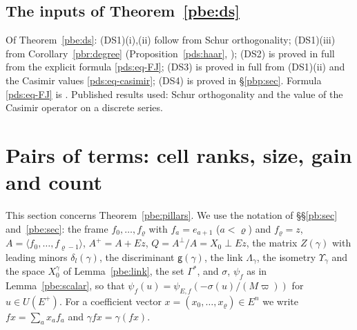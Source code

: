 \documentclass[10pt]{amsart}
\theoremstyle{definition}
\theoremstyle{remark}
\providecommand{\aubar}[1]{\overline{#1}}
\providecommand{\pbDid}{\mathcal D_{\mathrm{id}}}
\providecommand{\pbDmain}{\mathcal D_{\mathrm{main}}}
\providecommand{\pbR}{\overline R_0}
\begin{document}
\subsection{The inputs of Theorem~\ref{pbe:ds}}\label{pds:ss-summary}
Of Theorem~\ref{pbe:ds}: \textup{(DS1)(i),(ii)} follow from Schur orthogonality; \textup{(DS1)(iii)}
from Corollary~\ref{pbr:degree} \textup{(}Proposition~\ref{pds:haar}, {\cite[Proposition~2.19]{P49}}\textup{)}; \textup{(DS2)} is proved in full from the explicit formula
\eqref{pds:eq-FJ}; \textup{(DS3)} is proved in full from \textup{(DS1)(ii)} and the Casimir values
\eqref{pds:eq-casimir}; \textup{(DS4)} is proved in \S\ref{pbp:sec}. Formula \eqref{pds:eq-FJ} is
{\cite[Theorem~3.17]{P49}}. Published results used: Schur orthogonality and the value of the Casimir operator on a discrete series.



\providecommand{\auO}{\mathcal O}
\providecommand{\auNm}{\operatorname{Nm}}
\providecommand{\auA}{\mathbb A}
\providecommand{\aubar}[1]{\overline{#1}}
\providecommand{\auf}[1]{\texttt{#1}}
\providecommand{\panot}[1]{\par\smallskip{\raggedright\noindent\textbf{[Not proved here:} #1\textbf{]}\par}\smallskip}
\providecommand{\pbR}{\overline R_0}
\providecommand{\pbDid}{\mathcal D_{\mathrm{id}}}
\providecommand{\pbDmain}{\mathcal D_{\mathrm{main}}}
\providecommand{\pbg}{\mathsf g}
\providecommand{\pbeN}{\mathcal N}
\providecommand{\pbet}{\beta_*}
\providecommand{\pbenp}{\mathsf n_{\mathrm p}}
\providecommand{\pbesz}{\operatorname{size}}
\providecommand{\pbeGs}{\Gamma^*}
\providecommand{\pbeAp}{A^{+}}
\providecommand{\pbeCL}{\mathrm{CL}}
\providecommand{\ppiF}{\mathsf F}
\providecommand{\ppiLc}{\Lambda^{X}_{c}}
\providecommand{\ppidisc}{\operatorname{disc}}

\section{Pairs of terms: cell ranks, size, gain and count}\label{ppi:sec}

This section concerns Theorem~\ref{pbe:pillars}. We use the notation of \S\S\ref{pb:sec}
and~\ref{pbe:sec}: the frame $f_0,\dots,f_\varrho$ with $f_a=e_{a+1}$ ($a<\varrho$) and $f_\varrho=z$,
$A=\langle f_0,\dots,f_{\varrho-1}\rangle$, $\pbeAp=A+Ez$, $Q=A^\perp/A=X_0\perp Ez$, the matrix $Z(
\gamma)$ with leading minors $\delta_l(\gamma)$, the discriminant $\pbg(\gamma)$, the link
$\Lambda_\gamma$, the isometry $\Upsilon_\gamma$ and the space $X_0^\gamma$ of
Lemma~\ref{pbe:link}, the set $\pbeGs$, and $\sigma$, $\psi_f$ as in Lemma~\ref{pbe:scalar}, so that
$\psi_f(u)=\psi_{E,f}(-\sigma(u)/(M\varpi))$ for $u\in U(E^+)$. For a coefficient vector $x=(x_0,
\dots,x_\varrho)\in E^n$ we write $fx=\sum_ax_af_a$ and $\gamma fx=\gamma(fx)$.
\end{document}
